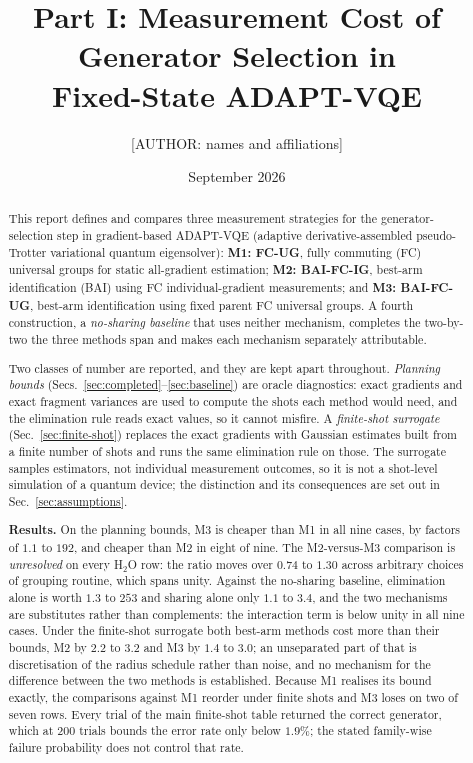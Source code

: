 \documentclass[10pt]{article}
\title{Part I: Measurement Cost of Generator Selection in\\Fixed-State ADAPT-VQE}
\author{[AUTHOR: names and affiliations]}
\date{September 2026}
\begin{document}
\maketitle

\begin{abstract}
This report defines and compares three measurement strategies for the generator-selection step in gradient-based ADAPT-VQE (adaptive derivative-assembled pseudo-Trotter variational quantum eigensolver): \textbf{M1: FC-UG}, fully commuting (FC) universal groups for static all-gradient estimation; \textbf{M2: BAI-FC-IG}, best-arm identification (BAI) using FC individual-gradient measurements; and \textbf{M3: BAI-FC-UG}, best-arm identification using fixed parent FC universal groups. A fourth construction, a \emph{no-sharing baseline} that uses neither mechanism, completes the two-by-two the three methods span and makes each mechanism separately attributable.

Two classes of number are reported, and they are kept apart throughout. \emph{Planning bounds} (Secs.~\ref{sec:completed}--\ref{sec:baseline}) are oracle diagnostics: exact gradients and exact fragment variances are used to compute the shots each method would need, and the elimination rule reads exact values, so it cannot misfire. A \emph{finite-shot surrogate} (Sec.~\ref{sec:finite-shot}) replaces the exact gradients with Gaussian estimates built from a finite number of shots and runs the same elimination rule on those. The surrogate samples estimators, not individual measurement outcomes, so it is not a shot-level simulation of a quantum device; the distinction and its consequences are set out in Sec.~\ref{sec:assumptions}.

\textbf{Results.} On the planning bounds, M3 is cheaper than M1 in all nine cases, by factors of $1.1$ to $192$, and cheaper than M2 in eight of nine. The M2-versus-M3 comparison is \emph{unresolved} on every H$_2$O row: the ratio moves over $0.74$ to $1.30$ across arbitrary choices of grouping routine, which spans unity. Against the no-sharing baseline, elimination alone is worth $1.3$ to $253$ and sharing alone only $1.1$ to $3.4$, and the two mechanisms are substitutes rather than complements: the interaction term is below unity in all nine cases. Under the finite-shot surrogate both best-arm methods cost more than their bounds, M2 by $2.2$ to $3.2$ and M3 by $1.4$ to $3.0$; an unseparated part of that is discretisation of the radius schedule rather than noise, and no mechanism for the difference between the two methods is established. Because M1 realises its bound exactly, the comparisons against M1 reorder under finite shots and M3 loses on two of seven rows. Every trial of the main finite-shot table returned the correct generator, which at 200 trials bounds the error rate only below $1.9\%$; the stated family-wise failure probability does not control that rate.


\end{abstract}
\end{document}

